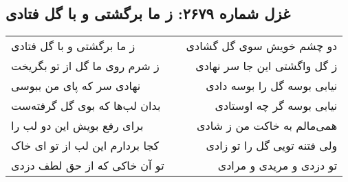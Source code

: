 \begin{center}
\section*{غزل شماره ۲۶۷۹: ز ما برگشتی و با گل فتادی}
\label{sec:2679}
\begin{longtable}{l p{0.5cm} r}
ز ما برگشتی و با گل فتادی
&&
دو چشم خویش سوی گل گشادی
\\
ز شرم روی ما گل از تو بگریخت
&&
ز گل واگشتی این جا سر نهادی
\\
نهادی سر که پای من ببوسی
&&
نیابی بوسه گل را بوسه دادی
\\
بدان لب‌ها که بوی گل گرفته‌ست
&&
نیابی بوسه گر چه اوستادی
\\
برای رفع بویش این دو لب را
&&
همی‌مالم به خاکت من ز شادی
\\
کجا بردارم این لب از تو ای خاک
&&
ولی فتنه تویی گل را تو زادی
\\
تو آن خاکی که از حق لطف دزدی
&&
تو دزدی و مریدی و مرادی
\\
\end{longtable}
\end{center}
